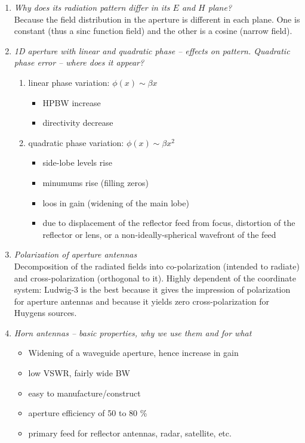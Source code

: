 \documentclass[11pt,a4paper]{article}
\begin{document}
\begin{enumerate}
    \item \emph{Why does its radiation pattern differ in its $E$ and $H$ plane?}\\
    Because the field distribution in the aperture is different in each plane. One is constant (thus a sinc function field) and the other is a cosine (narrow field).

    \item \emph{1D aperture with linear and quadratic phase -- effects on pattern. Quadratic phase error -- where does it appear?}
    \begin{enumerate}[label=(\alph*)]
        \item linear phase variation: $\phi(x) \sim \beta x$
        \begin{itemize}
            \item HPBW increase
            \item directivity decrease
        \end{itemize}
        \item quadratic phase variation: $\phi(x) \sim \beta x^2$
        \begin{itemize}
            \item side-lobe levels rise
            \item minumums rise (filling zeros)
            \item loos in gain (widening of the main lobe)
            \item due to displacement of the reflector feed from focus, distortion of the reflector or lens, or a non-ideally-spherical wavefront of the feed
        \end{itemize}
    \end{enumerate}

    \item \emph{Polarization of aperture antennas}\\
    Decomposition of the radiated fields into co-polarization (intended to radiate) and cross-polarization (orthogonal to it). Highly dependent of the coordinate system: Ludwig-3 is the best because it gives the impression of polarization for aperture antennas and because it yields zero cross-polarization for Huygens sources.
    
    \item \emph{Horn antennas -- basic properties, why we use them and for what}
    \begin{itemize}
        \item Widening of a waveguide aperture, hence increase in gain
        \item low VSWR, fairly wide BW
        \item easy to manufacture/construct
        \item aperture efficiency of 50 to 80 \%
        \item primary feed for reflector antennas, radar, satellite, etc.
    \end{itemize}
    

\end{enumerate}
\end{document}
